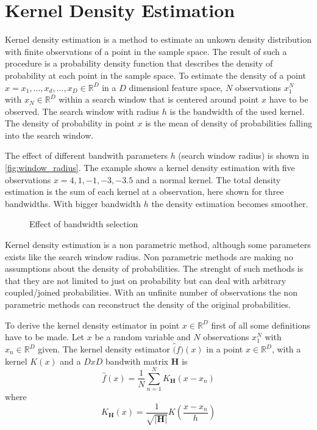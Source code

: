 \section{Kernel Density Estimation} %
\label{sec:kernel_density_estimation}
Kernel density estimation is a method to estimate an unkown density
distribution with finite observations of a point in the sample space. 
The result of such a procedure is a probability density function that describes 
the density of probability at each point in the sample space. To estimate the 
density of a point $x = { x_1, ... , x_d, ... , x_D} \in \mathbb{R}^D$ in a 
$D$ dimensionl feature space, $N$ observations $x_1^N$ with
 $x_N \in \mathbb{R}^D$ within a search window that is centered around point $x$
have to be observed. The search window with radius $h$ is the bandwidth of the
used kernel. The density of probability in point $x$ is the mean of density of
{\color{iRed}probabilities falling into the search window.}

The effect of different bandwith parameters $h$ (search window radius) is shown in 
\autoref{fig:window_radius}. The example shows a kernel density estimation with
five observations $x = 4, 1, -1, -3, -3.5$ and a normal kernel. The total density
estimation is the sum of each kernel at a observation, here shown for three 
bandwidths. With bigger bandwidth $h$ the density estimation becomes smoother.  

\begin{figure}[ht]
\centering
\caption{Effect of bandwidth selection}
\label{fig:window_radius}
\end{figure}


Kernel density estimation is a non parametric method, although some parameters
exists like the search window radius. Non parametric methods are making no 
assumptions about the density of probabilities. The strenght of such methods is
that they are not limited to just on probability but can deal with arbitrary
coupled/joined probabilities. With an unfinite number of observations the non
parametric methods can reconstruct the density of the original
probabilities.

To derive the kernel density estimator in point $x \in \mathbb{R}^D$ first of
all some definitions have to be made. Let $x$ be a random variable and $N$
observations $x_1^N$ with $x_n \in \mathbb{R}^D$ given. The kernel density
estimator $\hat(f)(x)$ in a point $x \in \mathbb{R}^D$, with a kernel $K(x)$ and a
$DxD$ bandwith matrix $\mathbf{H}$ is 
\begin{equation}\label{eq:kernel0}
	\hat{f}(x) = \frac{1}{N} \sum_{n = 1}^N K_{\mathbf{H}}\left( x-x_n \right)
\end{equation} 
where
\begin{equation}\label{eq:kernel1}
	K_{\mathbf{H}}(x) = \frac{1}{\sqrt{|\mathbf{H}|}}K \left( \frac{x - x_n}{h} \right)
\end{equation} 

